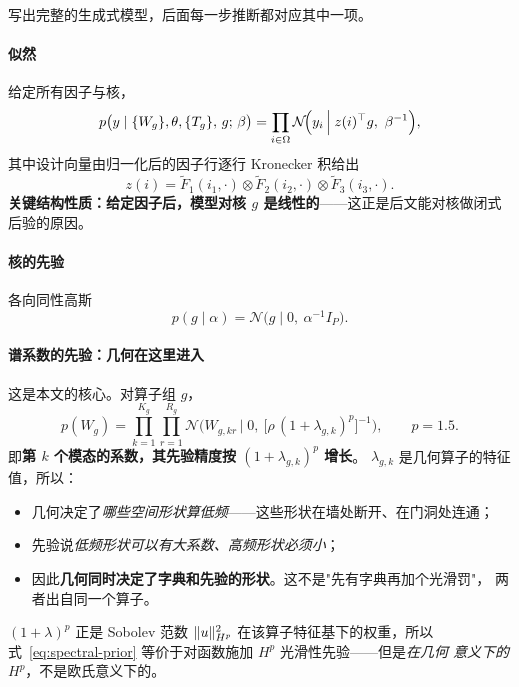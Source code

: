 \documentclass[11pt,a4paper]{article}
\begin{document}
写出完整的生成式模型，后面每一步推断都对应其中一项。

\paragraph{似然} 给定所有因子与核，
\begin{equation}
p\big(y \mid \{W_g\},\theta,\{T_g\},\,g;\,\beta\big)
=\prod_{i\in\Om}\mathcal N\!\Big(y_i \,\Big|\; z(i)^\top g,\ \beta^{-1}\Big),
\label{eq:likelihood}
\end{equation}
其中设计向量由归一化后的因子行逐行 Kronecker 积给出
\begin{equation}
z(i)=\tilde F_1(i_1,\cdot)\otimes\tilde F_2(i_2,\cdot)\otimes\tilde F_3(i_3,\cdot).
\label{eq:design}
\end{equation}
\textbf{关键结构性质：给定因子后，模型对核 $g$ 是线性的}——这正是后文能对核做闭式
后验的原因。

\paragraph{核的先验} 各向同性高斯
\begin{equation}
p(g\mid\alpha)=\mathcal N\big(g \mid 0,\ \alpha^{-1}I_P\big).
\label{eq:core-prior}
\end{equation}

\paragraph{谱系数的先验：几何在这里进入} 这是本文的核心。对算子组 $g$，
\begin{equation}
p(W_g)=\prod_{k=1}^{K_g}\prod_{r=1}^{R_g}
\mathcal N\!\Big(W_{g,kr}\,\Big|\;0,\ \big[\rho\,(1+\lambda_{g,k})^{p}\big]^{-1}\Big),
\qquad p=1.5 .
\label{eq:spectral-prior}
\end{equation}
即\textbf{第 $k$ 个模态的系数，其先验精度按 $(1+\lambda_{g,k})^p$ 增长}。
$\lambda_{g,k}$ 是几何算子的特征值，所以：

\begin{itemize}
\item 几何决定了\emph{哪些空间形状算低频}——这些形状在墙处断开、在门洞处连通；
\item 先验说\emph{低频形状可以有大系数、高频形状必须小}；
\item 因此\textbf{几何同时决定了字典和先验的形状}。这不是"先有字典再加个光滑罚"，
两者出自同一个算子。
\end{itemize}

$(1+\lambda)^p$ 正是 Sobolev 范数 $\lVert u \rVert_{H^p}^2$ 在该算子特征基下的权重，所以
式~\eqref{eq:spectral-prior} 等价于对函数施加 $H^p$ 光滑性先验——但是\emph{在几何
意义下的} $H^p$，不是欧氏意义下的。
\end{document}
